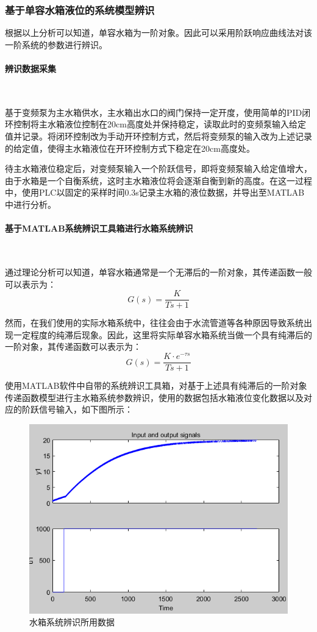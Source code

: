 \documentclass[UTF8]{article}
\begin{document}
\subsubsection{基于单容水箱液位的系统模型辨识}
根据以上分析可以知道，单容水箱为一阶对象。因此可以采用阶跃响应曲线法对该一阶系统的参数进行辨识。

\paragraph{辨识数据采集}~{}

基于变频泵为主水箱供水，主水箱出水口的阀门保持一定开度，使用简单的PID闭环控制将主水箱液位控制在20cm高度处并保持稳定，读取此时的变频泵输入给定值并记录。将闭环控制改为手动开环控制方式，然后将变频泵的输入改为上述记录的给定值，使得主水箱液位在开环控制方式下稳定在20cm高度处。

待主水箱液位稳定后，对变频泵输入一个阶跃信号，即将变频泵输入给定值增大，由于水箱是一个自衡系统，这时主水箱液位将会逐渐自衡到新的高度。在这一过程中，使用PLC以固定的采样时间0.3s记录主水箱的液位数据，并导出至MATLAB中进行分析。

\paragraph{基于MATLAB系统辨识工具箱进行水箱系统辨识}~{}

通过理论分析可以知道，单容水箱通常是一个无滞后的一阶对象，其传递函数一般可以表示为：
\begin{equation*}
	G(s) = \frac{K}{Ts + 1}
\end{equation*}

然而，在我们使用的实际水箱系统中，往往会由于水流管道等各种原因导致系统出现一定程度的纯滞后现象。因此，这里将实际单容水箱系统当做一个具有纯滞后的一阶对象，其传递函数可以表示为：
\begin{equation*}
	G(s) = \frac{K\cdot e^{-\tau s}}{Ts + 1}
\end{equation*}

使用MATLAB软件中自带的系统辨识工具箱，对基于上述具有纯滞后的一阶对象传递函数模型进行主水箱系统参数辨识，使用的数据包括水箱液位变化数据以及对应的阶跃信号输入，如下图所示：
\begin{figure}[H]
    \centering %
    \includegraphics[width=.6\textwidth]{figure/水箱辨识-辨识所用数据.png} 
    \caption{水箱系统辨识所用数据} %
\end{figure}
\end{document}
